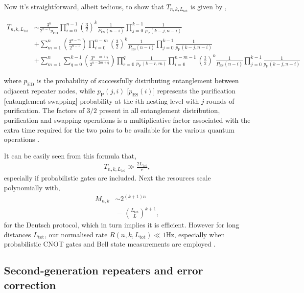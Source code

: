 Now it's straightforward, albeit tedious, to show that $T_{n,k,L_\mathrm{tot}}$ is given by \cite{bib:braztzik2013},
\begin{widetext}
\begin{align*}
 T_{n,k,L_\mathrm{tot}} &\sim \frac{3^n}{2^{n-1} p_\mathrm{ED}} \prod_{i=0}^{n-1} \left(\frac{3}{2}\right)^{k}  \frac{1}{P_\mathrm{ES}(n-i)  }\prod_{j=0}^{k-1} \frac{1}{p_\mathrm{P}(k-j,n-i)}  \nonumber \\
 &+\sum_{m=1}^n\left(\frac{3^{n-m}}{2^{n-1}}\right) \prod_{i=0}^{n-m}   \left(\frac{3}{2}\right)^{k} \frac{1}{P_\mathrm{ES}(n-i)}  \prod_{j=0}^{k-1}  \frac{1}{p_\mathrm{P}(k-j,n-i)}  \\
&+\sum_{m=1}^n {\sum_{q=0}^{k-1} \left(\frac{3^{n-m+q}}{2^{n- 2 m+q}}\right) \prod_{r=0}^{q}\frac{1}{p_\mathrm{P}(k-r,m)}} 
\prod_{i=0}^{n-m-1}   \left(\frac{3}{2}\right)^{k} \frac{1}{P_\mathrm{ES}(n-i)}  \prod_{j=0}^{k-1}  \frac{1}{p_\mathrm{P}(k-j,n-i)} \nonumber 
\end{align*}
\end{widetext}
where $p_\mathrm{ED}$ is the probability of successfully distributing entanglement between adjacent repeater nodes, while $p_\mathrm{P}(j,i)$ [$p_\mathrm{ES}(i)$] represents the purification [entanglement swapping] probability at the $i$th nesting level with $j$ rounds of purification. The factors of $3/2$ present in all entanglement distribution, purification and swapping operations is a multiplicative factor associated with the extra time required for the two pairs to be available for the various quantum operations \cite{bib:SSRG09}.

It can be easily seen from this formula that,
\begin{align}
	T_{n,k,L_\mathrm{tot}} \gg \frac{2 L_\mathrm{tot}}{c},
\end{align}
especially if probabilistic gates are included. Next the resources scale polynomially with,
\begin{align}
	M_{n,k} &\sim 2^{(k+1)n}\nonumber\\
	&= \left(\frac{L_\mathrm{tot}}{L}\right)^{k+1},
\end{align}
for the Deutsch protocol, which in turn implies it is efficient. However for long distances $L_\mathrm{tot}$, our normalised rate \mbox{$R(n,k,L_\mathrm{tot})\ll 1\mathrm{Hz}$}, especially when probabilistic CNOT gates and Bell state measurements are employed \cite{bib:jiang09, bib:munro10}.

\subsection{Second-generation repeaters and error correction}

